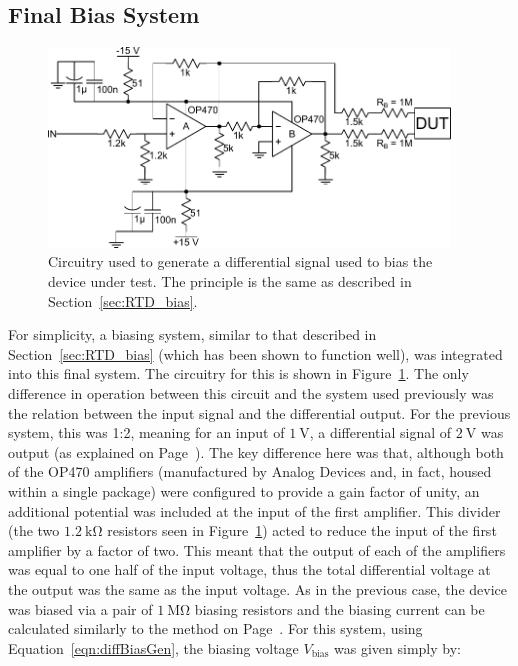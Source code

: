 \subsection{Final Bias System}\label{ssec:final_bias}
\begin{figure}[t]
\begin{center}
\includegraphics[width = 0.95\textwidth]{figures/final_bias}
\caption[Differential bias generator used with final readout system]{Circuitry used to generate a differential signal used to bias the device under test. The principle is the same as described in Section~\ref{sec:RTD_bias}.}
\label{fig:final_currGen}
\end{center}
\end{figure}
For simplicity, a biasing system, similar to that described in Section~\ref{sec:RTD_bias} (which has been shown to function well), was integrated into this final system. The circuitry for this is shown in Figure~\ref{fig:final_currGen}. The only difference in operation between this circuit and the system used previously was the relation between the input signal and the differential output. For the previous system, this was 1:2, meaning for an input of $1~\mathrm{V}$, a differential signal of $2~\mathrm{V}$ was output (as explained on Page~\pageref{res:RTDVbias}). The key difference here was that, although both of the OP470 amplifiers (manufactured by Analog Devices and, in fact, housed within a single package) were configured to provide a gain factor of unity, an additional potential was included at the input of the first amplifier. This divider (the two $1.2~\mathrm{k\Omega}$ resistors seen in Figure~\ref{fig:final_currGen}) acted to reduce the input of the first amplifier by a factor of two. This meant that the output of each of the amplifiers was equal to one half of the input voltage, thus the total differential voltage at the output was the same as the input voltage. As in the previous case, the device was biased via a pair of $1~\mathrm{M\Omega}$ biasing resistors and the biasing current can be calculated similarly to the method on Page~\pageref{eqn:diffBiasGen}. For this system, using Equation~\ref{eqn:diffBiasGen}, the biasing voltage $V_{\mathrm{bias}}$ was given simply by:
